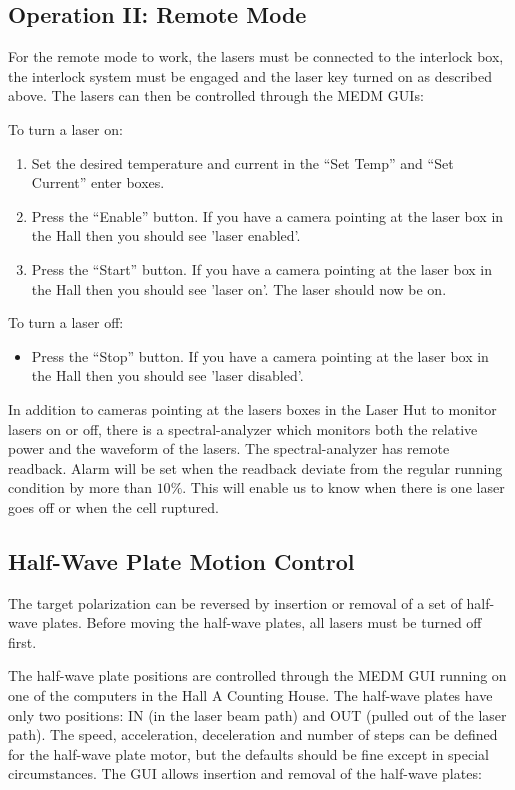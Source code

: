 {%
\subsection{Operation II: Remote Mode}

For the remote mode to work, 
the lasers must be connected to the interlock box,
the interlock system must be engaged and
the laser key turned on as described above. The lasers can then 
be controlled through the MEDM GUIs:

To turn a laser on:
\begin{enumerate} \setlength{\parskip}{0ex}
\item Set the desired temperature and current in the ``Set Temp'' 
and ``Set Current'' enter boxes.
\item Press the ``Enable'' button.  If you have a camera pointing
at the laser box in the Hall then you should see 'laser enabled'.
\item Press the ``Start'' button.  If you have a camera pointing
at the laser box in the Hall then you should see 'laser on'.  The
laser should now be on.
\end{enumerate}
To turn a laser off:
\begin{itemize}
\item Press the ``Stop'' button.  If you have a camera pointing
at the laser box in the Hall then you should see 'laser disabled'.
\end{itemize}

In addition to cameras pointing at the lasers boxes in the Laser Hut to 
monitor lasers on or off, there is a spectral-analyzer which monitors
both the relative power and the waveform of the lasers. The spectral-analyzer 
has remote readback.  Alarm will be set when the readback deviate
from the regular running condition by more than $10\%$. This will enable us 
to know when there is one laser goes off or when the cell ruptured.

\subsection{Half-Wave Plate Motion Control}
The target polarization can be reversed by insertion or removal of 
a set of half-wave plates. Before moving the half-wave plates, all lasers
must be turned off first.

The half-wave plate positions are controlled through the MEDM GUI running
on one of the computers in the Hall A Counting House.  The half-wave plates
have only two positions: IN (in the laser beam path) and OUT (pulled out
of the laser path).  The speed, acceleration, deceleration and number of
steps can be defined for the half-wave plate motor, but the defaults
should be fine except in special circumstances.  The GUI allows 
insertion and removal of the half-wave plates:

}
